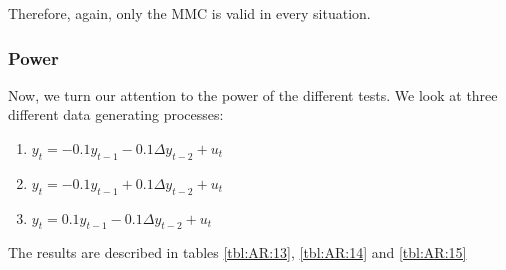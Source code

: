 \documentclass[11pt]{article}\usepackage[]{graphicx}\usepackage[]{color}
\begin{document}
Therefore, again, only the MMC is valid in every situation.

\subsubsection{Power}

Now, we turn our attention to the power of the different tests. We look at three different data generating processes:
\begin{enumerate}
	\item $y_t = -0.1 y_{t-1} - 0.1  \Delta y_{t-2} +u_t$
	\item $y_t = -0.1 y_{t-1} + 0.1 \Delta y_{t-2} +u_t$
	\item $y_t = 0.1 y_{t-1} - 0.1  \Delta y_{t-2} +u_t$
\end{enumerate}

The results are described in tables \ref{tbl:AR:13}, \ref{tbl:AR:14}  and \ref{tbl:AR:15}


\begin{table}[H]
	\centering
	\caption{Empirical levels for 250 replications of AR(p) process where $\alpha = 5\%$ and n=50, testing $H_0: \gamma = 0$ against $H_1:  \gamma < 0$}
	\label{tbl:AR:13}
\end{table}
\end{document}
